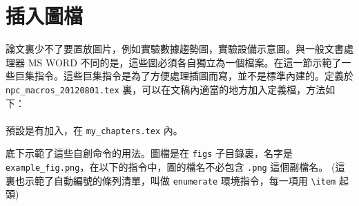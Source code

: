 \section{插入圖檔}
\label{sec:fig}

論文裏少不了要置放圖片，例如實驗數據趨勢圖，實驗設備示意圖。與一般文書處理器 MS WORD 不同的是，這些圖必須各自獨立為一個檔案。在這一節示範了一些巨集指令。這些巨集指令是為了方便處理插圖而寫，並不是標準內建的。定義於 \verb+npc_macros_20120801.tex+ 裏，可以在文稿內適當的地方加入定義檔，方法如下：\\
\verb++\\
預設是有加入，在  \verb+my_chapters.tex+ 內。

底下示範了這些自創命令的用法。圖檔是在 \texttt{figs} 子目錄裏，名字是 \verb+example_fig.png+，在以下的指令中，圖的檔名不必包含 \verb+.png+ 這個副檔名。 (這裏也示範了自動編號的條列清單，叫做 \texttt{enumerate} 環境指令，每一項用 \verb+\item+ 起頭)


